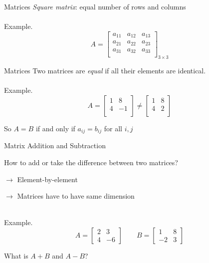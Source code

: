 \documentclass{./../../Latex/teaching_slides}
\begin{document}
\begin{frame}{Matrices}
\textit{Square matrix}: equal number of rows and columns \\~\\
Example.
$$A = \begin{bmatrix}
a_{11} & a_{12} & a_{13} \\
a_{21} & a_{22} & a_{23} \\
a_{31} & a_{32} & a_{33} \\
\end{bmatrix}_{3\times 3}$$
\end{frame}

\begin{frame}{Matrices}
Two matrices are \textit{equal} if all their elements are identical. \\~\\
Example.
$$A = \begin{bmatrix}
1 & 8  \\
4 &-1  \\
\end{bmatrix} \neq
 \begin{bmatrix}
1 & 8  \\
4 & 2  \\
\end{bmatrix}$$

\vspace{2em}
So $A=B$ if and only if $a_{ij} = b_{ij}$ for all $i, j$
\end{frame}

\begin{frame}{Matrix Addition and Subtraction}
\begin{witemize}
\item How to add or take the difference between two matrices? 
\item[] \hspace{1em} $\rightarrow$ Element-by-element
\item[] \hspace{1em} $\rightarrow$  Matrices have to have same dimension \\~\\
\end{witemize}
Example.
$$A = \begin{bmatrix}
2 & 3 \\
4 & -6 
 \end{bmatrix} \quad \quad
B = \begin{bmatrix}
1 & 8 \\
-2 & 3
\end{bmatrix}$$
\begin{witemize}
\item What is $A+B$ and $A-B$?
\end{witemize}
\end{frame}
\end{document}
